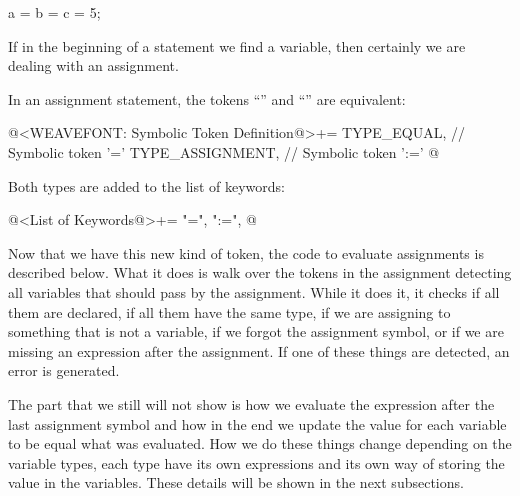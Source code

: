 \alinhaverbatim
a = b = c = 5;
\alinhanormal

If in the beginning of a statement we find a variable, then certainly
we are dealing with an assignment.

In an assignment statement, the tokens ``\monoespaco{=}'' and
``\monoespaco{:=}'' are equivalent:

\iniciocodigo
@<WEAVEFONT: Symbolic Token Definition@>+=
TYPE_EQUAL,            // Symbolic token '='
TYPE_ASSIGNMENT,       // Symbolic token ':='
@
\fimcodigo

Both types are added to the list of keywords:

\iniciocodigo
@<List of Keywords@>+=
"=", ":=",
@
\fimcodigo

Now that we have this new kind of token, the code to evaluate
assignments is described below. What it does is walk over the tokens
in the assignment detecting all variables that should pass by the
assignment. While it does it, it checks if all them are declared, if
all them have the same type, if we are assigning to something that is
not a variable, if we forgot the assignment symbol, or if we are
missing an expression after the assignment. If one of these things are
detected, an error is generated.

The part that we still will not show is how we evaluate the expression
after the last assignment symbol and how in the end we update the
value for each variable to be equal what was evaluated. How we do
these things change depending on the variable types, each type have
its own expressions and its own way of storing the value in the
variables. These details will be shown in the next subsections.

